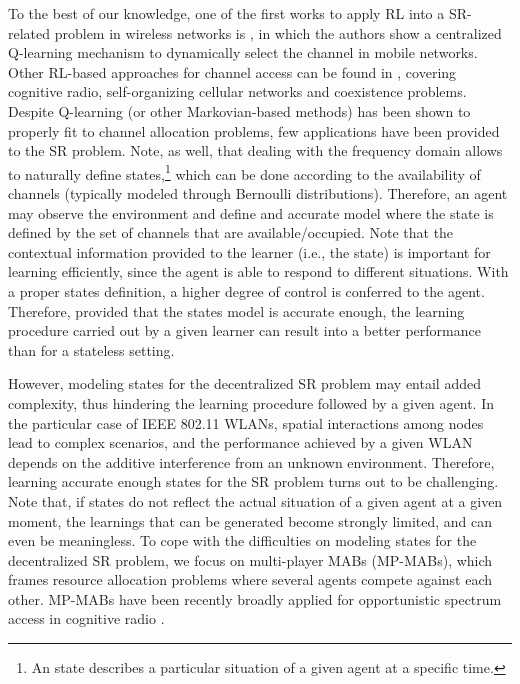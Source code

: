 \documentclass[preprint,12pt]{elsarticle}
\begin{document}
To the best of our knowledge, one of the first works to apply RL into a SR-related problem in wireless networks is \cite{nie1999q}, in which the authors show a centralized Q-learning mechanism to dynamically select the channel in mobile networks. Other RL-based approaches for channel access can be found in \cite{li2009multi, bennis2010q, bennis2011distributed, sallent2015learning, rupasinghe2015reinforcement}, covering cognitive radio, self-organizing cellular networks and coexistence problems. Despite Q-learning (or other Markovian-based methods) has been shown to properly fit to channel allocation problems, few applications have been provided to the SR problem. Note, as well, that dealing with the frequency domain allows to naturally define states,\footnote{An state describes a particular situation of a given agent at a specific time.} which can be done according to the availability of channels (typically modeled through Bernoulli distributions). Therefore, an agent may observe the environment and define and accurate model where the state is defined by the set of channels that are available/occupied. Note that the contextual information provided to the learner (i.e., the state) is important for learning efficiently, since the agent is able to respond to different situations. With a proper states definition, a higher degree of control is conferred to the agent. Therefore, provided that the states model is accurate enough, the learning procedure carried out by a given learner can result into a better performance than for a stateless setting. 

However, modeling states for the decentralized SR problem may entail added complexity, thus hindering the learning procedure followed by a given agent. In the particular case of IEEE 802.11 WLANs, spatial interactions among nodes lead to complex scenarios, and the performance achieved by a given WLAN depends on the additive interference from an unknown environment. Therefore, learning accurate enough states for the SR problem turns out to be challenging. Note that, if states do not reflect the actual situation of a given agent at a given moment, the learnings that can be generated become strongly limited, and can even be meaningless. To cope with the difficulties on modeling states for the decentralized SR problem, we focus on multi-player MABs (MP-MABs), which frames resource allocation problems where several agents compete against each other. MP-MABs have been recently broadly applied for opportunistic spectrum access in cognitive radio \cite{liu2010distributed, anandkumar2011distributed, rosenski2016multi, maghsudi2015joint, maghsudi2015channel}. 
\end{document}
